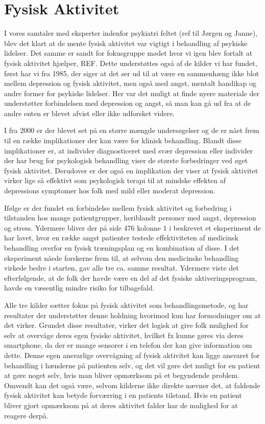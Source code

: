 \section{Fysisk Aktivitet}
I vores samtaler med eksperter indenfor psykiatri feltet (ref til Jørgen og Janne), blev det klart at de mente fysisk aktivitet var vigtigt i behandling af psykiske lidelser.
Det samme er sandt for fokusgruppe mødet hvor vi igen blev fortalt at fysisk aktivitet hjælper, REF.
Dette understøttes også af de kilder vi har fundet, først har vi \citet{misc:healthReports} fra 1985, der siger at det ser ud til at være en sammenhæng ikke blot mellem depression og fysisk aktivitet, men også med angst, mentalt handikap og andre former for psykiske lidelser.
Her var det muligt at finde nyere materiale der understøtter forbindelsen med depression og angst, så man kan gå ud fra at de andre enten er blevet afvist eller ikke udforsket videre.

I \citet{art:physMental} fra 2000 er der blevet set på en større mængde undersøgelser og de er nået frem til en række implikationer der kan være for klinisk behandling.
Blandt disse implikationer er, at individer diagnosticeret med svær depression eller individer der har brug for psykologisk behandling viser de største forbedringer ved øget fysisk aktivitet.
Derudover er der også en implikation der viser at fysisk aktivitet virker lige så effektivt som psykologisk terapi til at mindske effekten af depressions symptomer hos folk med mild eller moderat depression.

Ifølge \citet{book:sportPsyc} er der fundet en forbindelse mellem fysisk aktivitet og forbedring i tilstanden hos mange patientgrupper, heriblandt personer med angst, depression og stress.
Ydermere bliver der på side 476 kolonne 1 i \citet{book:sportPsyc} beskrevet et eksperiment de har lavet, hvor en række angst patienter testede effektiviteten af medicinsk behandling overfor en fysisk træningsplan og en kombination af disse.
I det eksperiment nåede forskerne frem til, at selvom den medicinske behandling virkede bedre i starten, gav alle tre ca. samme resultat.
Ydermere viste det efterfølgende, at de folk der havde være en del af det fysiske aktiveringsprogram, havde en væsentlig mindre risiko for tilbagefald.

Alle tre kilder sætter fokus på fysisk aktivitet som behandlingsmetode, \citet{art:physMental} og \citet{book:sportPsyc} har resultater der understøtter denne holdning hvorimod \citet{misc:healthReports} kun har formodninger om at det virker.
Grundet disse resultater, virker det logisk at give folk mulighed for selv at overvåge deres egen fysiske aktivitet, hvilket fx kunne gøres via deres smartphone, da der er mange sensorer i en telefon der kan give information om dette.
Denne egen ansvarlige overvågning af fysisk aktivitet kan ligge ansvaret for behandling i hænderne på patienten selv, og det vil gøre det muligt for en patient at gøre noget selv, hvis man bliver opmærksom på et begyndende problem.
Omvendt kan det også være, selvom kilderne ikke direkte nævner det, at faldende fysisk aktivitet kan betyde forværring i en patients tilstand.
Hvis en patient bliver gjort opmærksom på at deres aktivitet falder har de mulighed for at reagere derpå.

